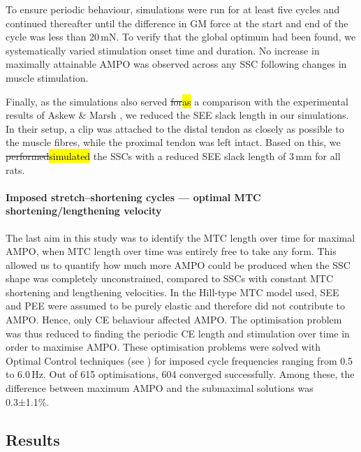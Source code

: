 \documentclass[
  10pt,
  letterpaper,
]{article}
\begin{document}
To ensure periodic behaviour, simulations were run for at least five
cycles and continued thereafter until the difference in GM force at the
start and end of the cycle was less than 20\,mN. To verify that the
global optimum had been found, we systematically varied stimulation
onset time and duration. No increase in maximally attainable AMPO was
observed across any SSC following changes in muscle stimulation.

Finally, as the simulations also served \st{for}\hl{as} a comparison
with the experimental results of Askew \& Marsh
{\citep{askew_effects_1997, askew_optimal_1998}}, we reduced the SEE
slack length in our simulations. In their setup, a clip was attached to
the distal tendon as closely as possible to the muscle fibres, while the
proximal tendon was left intact. Based on this, we
\st{performed}\hl{simulated} the SSCs with a reduced SEE slack length of
3\,mm for all rats.

\paragraph{Imposed stretch--shortening cycles --- optimal MTC
shortening/lengthening
velocity}\label{imposed-stretchshortening-cycles-optimal-mtc-shorteninglengthening-velocity}

The last aim in this study was to identify the MTC length over time for
maximal AMPO, when MTC length over time was entirely free to take any
form. This allowed us to quantify how much more AMPO could be produced
when the SSC shape was completely unconstrained, compared to SSCs with
constant MTC shortening and lengthening velocities. In the Hill-type MTC
model used, SEE and PEE were assumed to be purely elastic
\citep[e.g.][]{anderson_dynamic_1999, van_soest_contribution_1993} and
therefore did not contribute to AMPO. Hence, only CE behaviour affected
AMPO. The optimisation problem was thus reduced to finding the periodic
CE length and stimulation over time in order to maximise AMPO. These
optimisation problems were solved with Optimal Control techniques (see
{}) for imposed cycle frequencies ranging from 0.5 to
6.0\,Hz. Out of 615 optimisations, 604 converged successfully. Among
these, the difference between maximum AMPO and the submaximal solutions
was 0.3±1.1\%.

\subsection{Results}\label{results}
\end{document}
